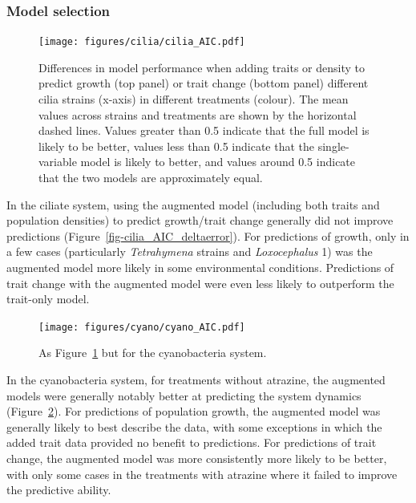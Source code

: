 \documentclass[
  letterpaper,
  DIV=11,
  numbers=noendperiod]{scrartcl}
\begin{document}
\subsubsection{Model selection}\label{model-selection}

\begin{figure}

{\centering \texttt{[image: figures/cilia/cilia\_AIC.pdf]}

}

\caption{\label{fig-cilia_AIC}Differences in model performance when
adding traits or density to predict growth (top panel) or trait change
(bottom panel) different cilia strains (x-axis) in different treatments
(colour). The mean values across strains and treatments are shown by the
horizontal dashed lines. Values greater than 0.5 indicate that the full
model is likely to be better, values less than 0.5 indicate that the
single-variable model is likely to better, and values around 0.5
indicate that the two models are approximately equal.}

\end{figure}

In the ciliate system, using the augmented model (including both traits
and population densities) to predict growth/trait change generally did
not improve predictions (Figure~\ref{fig-cilia_AIC_deltaerror}). For
predictions of growth, only in a few cases (particularly
\emph{Tetrahymena} strains and \emph{Loxocephalus} 1) was the augmented
model more likely in some environmental conditions. Predictions of trait
change with the augmented model were even less likely to outperform the
trait-only model.

\begin{figure}

{\centering \texttt{[image: figures/cyano/cyano\_AIC.pdf]}

}

\caption{\label{fig-cyano_AIC}As Figure~\ref{fig-cilia_AIC} but for the
cyanobacteria system.}

\end{figure}

In the cyanobacteria system, for treatments without atrazine, the
augmented models were generally notably better at predicting the system
dynamics (Figure~\ref{fig-cyano_AIC}). For predictions of population
growth, the augmented model was generally likely to best describe the
data, with some exceptions in which the added trait data provided no
benefit to predictions. For predictions of trait change, the augmented
model was more consistently more likely to be better, with only some
cases in the treatments with atrazine where it failed to improve the
predictive ability.
\end{document}
